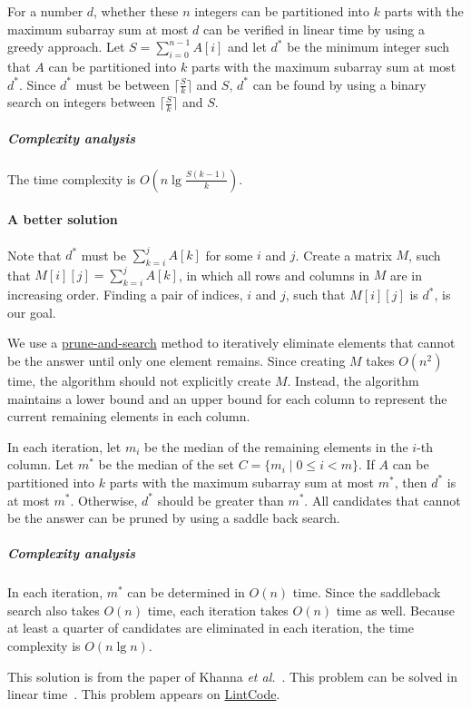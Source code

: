 \begin{Answer}
For a number $d$, whether these $n$ integers can be partitioned into $k$ parts with the maximum subarray sum at most $d$ can be verified in linear time by using a greedy approach.
Let $S = \sum_{i=0}^{n-1} A[i]$ and let $d^*$ be the minimum integer such that $A$ can be partitioned into $k$ parts with the maximum subarray sum at most $d^*$. 
Since $d^*$ must be between $\lceil \frac{S}{k} \rceil$ and $S$, $d^*$ can be found by using a binary search on integers between $\lceil \frac{S}{k} \rceil$ and $S$.
\subparagraph{Complexity analysis} The time complexity is $O(n \lg \frac{S(k-1)}{k})$.

\paragraph{A better solution}  Note that $d^*$ must be $\sum_{k=i}^j A[k]$ for some $i$ and $j$.
Create a matrix $M$, such that $M[i][j] = \sum_{k=i}^j A[k]$, in which all rows and columns in $M$ are in increasing order.
Finding a pair of indices, $i$ and $j$, such that $M[i][j]$ is $d^*$, is our goal.

We use a \href{https://en.wikipedia.org/wiki/Prune_and_search}{prune-and-search} method to iteratively eliminate elements that cannot be the answer until only one element remains.
Since creating $M$ takes $O(n^2)$ time, the algorithm should not explicitly create $M$.
Instead, the algorithm maintains a lower bound and an upper bound for each column to represent the current remaining elements in each column.

In each iteration, let $m_i$ be the median of the remaining elements in the $i$-th column.
Let $m^*$ be the median of the set $C = \{ m_i \mid 0 \leq i < m \}$.
If $A$ can be partitioned into $k$ parts with the maximum subarray sum at most $m^*$, then $d^*$ is at most $m^*$.
Otherwise, $d^*$ should be greater than $m^*$.
All candidates that cannot be the answer can be pruned by using a saddle back search.

\subparagraph{Complexity analysis} In each iteration, $m^*$ can be determined in $O(n)$ time. 
Since the saddleback search also takes $O(n)$ time, each iteration takes $O(n)$ time as well. 
Because at least a quarter of candidates are eliminated in each iteration, the time complexity is $O(n \lg n)$.
\begin{remark}
This solution is from the paper of Khanna \emph{et al.}~\cite{Khanna1997}. This problem can be solved in linear time~\cite{Frederickson1991}. This problem appears on \href{http://www.lintcode.com/en/problem/copy-books/}{LintCode}.
\end{remark}
\end{Answer}

